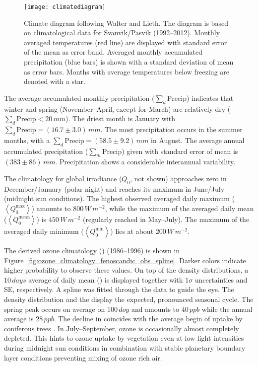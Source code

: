 \documentclass[bg, manuscript]{copernicus}
\begin{document}
\begin{figure}[t]
  \texttt{[image: climatediagram]}
  \caption{Climate diagram following Walter and Lieth. The diagram is based on climatological data for Svanvik/Pasvik (1992--2012). Monthly averaged temperatures (red line) are displayed with standard error of the mean as error band. Averaged monthly accumulated precipitation (blue bars) is shown with a standard deviation of mean as error bars. Months with average temperatures below freezing are denoted with a star.}
  \label{fig:climatediagram}
\end{figure}

The average accumulated monthly precipitation ($\sum_d\mathrm{Precip}$) indicates that winter and spring (November--April, except for March) are relatively dry ($\sum_d\mathrm{Precip} < 20\,\unit{mm}$). The driest month is January with $\sum_d\mathrm{Precip} = (16.7\pm 3.0)\,\unit{mm}$. The most precipitation occurs in the summer months, with a $\sum_d\mathrm{Precip} = (58.5\pm 9.2)\,\unit{mm}$ in August. The average annual accumulated precipitation ($\sum_m\mathrm{Precip}$) given with standard error of mean is $(383\pm 86)\,\unit{mm}$. Precipitation shows a considerable interannual variability.

The climatology for global irradiance ($Q_0$, not shown) approaches zero in December/January (polar night) and reaches its maximum in June/July (midnight sun conditions). The highest observed averaged daily maximum ($\left<Q_0^\mathrm{max}\right>$) amounts to $800\,\unit{W\,m^{-2}}$, while the maximum of the averaged daily mean ($\left<Q_0^\mathrm{mean}\right>$) is $450\,\unit{W\,m^{-2}}$ (regularly reached in May--July). The maximum of the averaged daily minimum ($\left<Q_0^\mathrm{min}\right>$) lies at about $200\,\unit{W\,m^{-2}}$.

The derived ozone climatology (\chem{\left<[O_3]\right>}) (1986--1996) is shown in Figure~\ref{fig:ozone_climatology_fenoscandic_obs_spline}. Darker colors indicate higher probability to observe these values. On top of the density distributions, a $10\,\unit{days}$ average of daily mean () is displayed together with $1 \sigma$ uncertainties and SE, respectively. A spline was fitted through the data to guide the eye. The \chem{[O_3]} density distribution and the  display the expected, pronounced seasonal cycle. The spring peak occurs on average on $100\,\unit{doy}$ and amounts to $40\,\unit{ppb}$ while the annual average \chem{\left<[O_3]\right>} is $28\,\unit{ppb}$. The decline in \chem{\left<[O_3]\right>} coincides with the average begin of  uptake by coniferous trees \citep{TB:Kolari2007, TP:Wallin2013}. In July--September, ozone is occasionally almost completely depleted. This hints to ozone uptake by vegetation even at low light intensities during midnight sun conditions in combination with stable planetary boundary layer conditions preventing mixing of ozone rich air.
\end{document}
